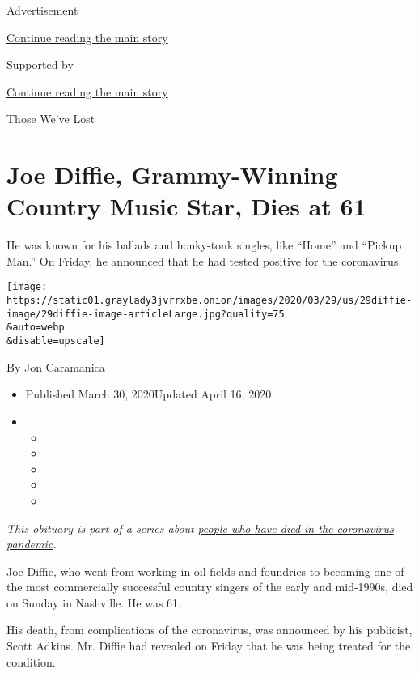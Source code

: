 Advertisement

\protect\hyperlink{after-top}{Continue reading the main story}

Supported by

\protect\hyperlink{after-sponsor}{Continue reading the main story}

Those We've Lost

\hypertarget{joe-diffie-grammy-winning-country-music-star-dies-at-61}{%
\section{Joe Diffie, Grammy-Winning Country Music Star, Dies at
61}\label{joe-diffie-grammy-winning-country-music-star-dies-at-61}}

He was known for his ballads and honky-tonk singles, like ``Home'' and
``Pickup Man.'' On Friday, he announced that he had tested positive for
the coronavirus.

\texttt{[image: https://static01.graylady3jvrrxbe.onion/images/2020/03/29/us/29diffie-image/29diffie-image-articleLarge.jpg?quality=75\\\&auto=webp\\\&disable=upscale]}

By \href{https://www.nytimes3xbfgragh.onion/by/jon-caramanica}{Jon
Caramanica}

\begin{itemize}
\item
  Published March 30, 2020Updated April 16, 2020
\item
  \begin{itemize}
  \item
  \item
  \item
  \item
  \item
  \end{itemize}
\end{itemize}

\emph{This obituary is part of a series about}
\href{https://www.nytimes3xbfgragh.onion/series/people-who-have-died-of-the-coronavirus}{\emph{people
who have died in the coronavirus pandemic}}\emph{.}

Joe Diffie, who went from working in oil fields and foundries to
becoming one of the most commercially successful country singers of the
early and mid-1990s, died on Sunday in Nashville. He was 61.

His death, from complications of the coronavirus, was announced by his
publicist, Scott Adkins. Mr. Diffie had revealed on Friday that he was
being treated for the condition.

